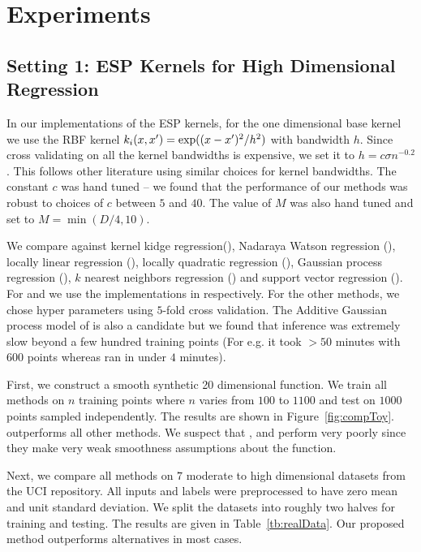 \section{Experiments}
\label{sec:experiments}

\insertTableRealData

\subsection{Setting 1: ESP Kernels for High Dimensional Regression}

In our implementations of the ESP kernels, for the one dimensional base kernel we use
the RBF kernel $k_i(x,x') = \exp((x-x')^2/h^2)$ with bandwidth $h$.
Since cross validating on all the kernel bandwidths is expensive, we set
it to $h = c\sigma n^{-0.2}$. This follows other literature 
\cite{gyorfi02distributionfree,ravikumar09spam} using similar choices for kernel
bandwidths. The constant $c$ was hand tuned -- we found that the performance of
our methods was robust to choices of $c$ between $5$ and $40$.
The value of $M$ was also hand tuned and set to $M = \min(D/4, 10)$.

We compare \addkrrs against kernel kidge regression(\krr),
Nadaraya Watson regression (\nw), locally linear regression (\locallin), locally
quadratic regression (\localquad), Gaussian process regression (\gp), $k$
nearest neighbors regression (\knn) and support vector regression (\svr).
For \gps and \svrs we use the implementations in
\citet{rasmussen10gpml,chang11libsvm} respectively.
For the other methods, we chose hyper parameters using $5$-fold cross
validation.
The Additive Gaussian process model of \citet{duvenaud11additivegps} is also a
candidate but we found that inference was extremely slow beyond a few hundred
training points (For e.g. it took $> 50$ minutes with $600$ points whereas
\addkrrs ran in under $4$ minutes).

First, we construct a smooth synthetic 20 dimensional function. We train all methods on
$n$ training points where $n$ varies from $100$ to $1100$ and test on $1000$
points sampled independently. The results are shown in Figure~\ref{fig:compToy}.
\addkrrs outperforms all other methods. We suspect that \nw, \locallins and \knns perform
very poorly since they make very weak smoothness assumptions about the function.

Next, we compare all methods on $7$ moderate to high dimensional datasets from the UCI
repository. All inputs and labels were preprocessed to have zero mean and unit
standard deviation. We split the datasets into roughly two halves for training
and testing. The results are given in Table~\ref{tb:realData}. Our proposed
method outperforms alternatives in most cases.

